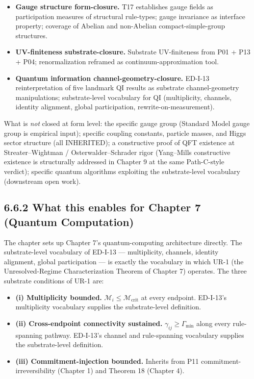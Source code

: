 \documentclass[11pt]{book}
\begin{document}
\begin{itemize}
\item \textbf{Gauge structure form-closure.} T17 establishes gauge fields as participation measures of structural rule-types; gauge invariance as interface property; coverage of Abelian and non-Abelian compact-simple-group structures.
\item \textbf{UV-finiteness substrate-closure.} Substrate UV-finiteness from P01 + P13 + P04; renormalization reframed as continuum-approximation tool.
\item \textbf{Quantum information channel-geometry-closure.} ED-I-13 reinterpretation of five landmark QI results as substrate channel-geometry manipulations; substrate-level vocabulary for QI (multiplicity, channels, identity alignment, global participation, rewrite-on-measurement).
\end{itemize}

What is \textit{not} closed at form level: the specific gauge group (Standard Model gauge group is empirical input); specific coupling constants, particle masses, and Higgs sector structure (all INHERITED); a constructive proof of QFT existence at Streater–Wightman / Osterwalder–Schrader rigor (Yang–Mills constructive existence is structurally addressed in Chapter 9 at the same Path-C-style verdict); specific quantum algorithms exploiting the substrate-level vocabulary (downstream open work).

\subsection{6.6.2 What this enables for Chapter 7 (Quantum Computation)}

The chapter sets up Chapter 7's quantum-computing architecture directly. The substrate-level vocabulary of ED-I-13 — multiplicity, channels, identity alignment, global participation — is exactly the vocabulary in which UR-1 (the Unresolved-Regime Characterization Theorem of Chapter 7) operates. The three substrate conditions of UR-1 are:

\begin{itemize}
\item \textbf{(i) Multiplicity bounded.} $\mathcal{M}_i \leq \mathcal{M}_\mathrm{crit}$ at every endpoint. ED-I-13's multiplicity vocabulary supplies the substrate-level definition.
\item \textbf{(ii) Cross-endpoint connectivity sustained.} $\gamma_{ij} \geq \Gamma_\mathrm{min}$ along every rule-spanning pathway. ED-I-13's channel and rule-spanning vocabulary supplies the substrate-level definition.
\item \textbf{(iii) Commitment-injection bounded.} Inherits from P11 commitment-irreversibility (Chapter 1) and Theorem 18 (Chapter 4).
\end{itemize}
\end{document}
